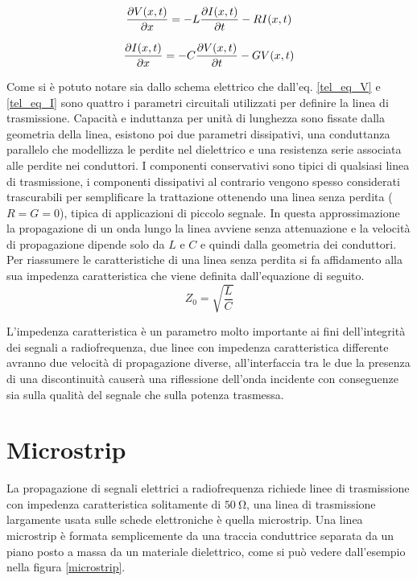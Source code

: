 \documentclass[12pt,oneside]{book}
\begin{document}
\begin{equation}
    \pdv{V(x,t)}{x}=-L\pdv{I(x,t)}{t}-RI(x,t)
    \label{tel_eq_V}
\end{equation} 

\begin{equation}
    \pdv{I(x,t)}{x}=-C\pdv{V(x,t)}{t}-GV(x,t)
    \label{tel_eq_I}
\end{equation} 





Come si è potuto notare sia dallo schema elettrico che dall'eq. \eqref{tel_eq_V} e \eqref{tel_eq_I} sono quattro i parametri circuitali utilizzati per definire la linea di trasmissione. Capacità e induttanza per unità di lunghezza sono fissate dalla geometria della linea, esistono poi due parametri dissipativi, una conduttanza parallelo che modellizza le perdite nel dielettrico e una resistenza serie associata alle perdite nei conduttori. I componenti conservativi sono tipici di qualsiasi linea di trasmissione, i componenti dissipativi al contrario vengono spesso considerati trascurabili per semplificare la trattazione ottenendo una linea senza perdita ($R=G=0$), tipica di applicazioni di piccolo segnale. In questa approssimazione la propagazione di un onda lungo la linea avviene senza attenuazione e la velocità di propagazione dipende solo da $L$ e $C$ e quindi dalla geometria dei conduttori. Per riassumere le caratteristiche di una linea senza perdita si fa affidamento alla sua impedenza caratteristica che viene definita dall'equazione di seguito.
\begin{equation}
    Z_0=\sqrt{\dfrac{L}{C}}
\end{equation}

L'impedenza caratteristica è un parametro molto importante ai fini dell'integrità dei segnali a radiofrequenza, due linee con impedenza caratteristica differente avranno due velocità di propagazione diverse, all'interfaccia tra le due la presenza di una discontinuità causerà una riflessione dell'onda incidente con conseguenze sia sulla qualità del segnale che sulla potenza trasmessa.

\section{Microstrip}
La propagazione di segnali elettrici a radiofrequenza richiede linee di trasmissione con impedenza caratteristica solitamente di $\SI{50}{\ohm}$, una linea di trasmissione largamente usata sulle schede elettroniche è quella microstrip. Una linea microstrip è formata semplicemente da una traccia conduttrice separata da un piano posto a massa da un materiale dielettrico, come si può vedere dall'esempio nella figura \ref{microstrip}.
\end{document}
